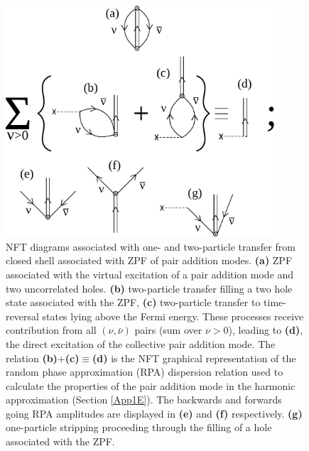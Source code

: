 \begin{figure}[h!]
\centerline {
\includegraphics*[width=10cm]{nutshell/figs/fig2_1_5}
}
\caption{NFT diagrams associated with one- and two-particle transfer from closed shell associated with ZPF of pair addition modes. \textbf{(a)} ZPF associated with the virtual excitation of a pair addition mode and two uncorrelated holes. \textbf{(b)} two-particle transfer filling a two hole state associated with the ZPF, \textbf{(c)} two-particle transfer to time-reversal states lying above the Fermi energy. These processes receive contribution from all $(\nu,\bar\nu)$ pairs (sum over $\nu>0$), leading to \textbf{(d)}, the direct excitation of the collective pair addition mode. The relation \textbf{(b)}+\textbf{(c)}$\equiv$\textbf{(d)} is the NFT graphical representation of the random phase approximation (RPA) dispersion relation used to calculate the properties of the pair addition mode in the harmonic approximation (Section \ref{App1E}). The backwards and forwards going RPA amplitudes are displayed in  \textbf{(e)} and \textbf{(f)} respectively. \textbf{(g)} one-particle stripping proceeding through the filling of a hole associated with the ZPF.}
\label{fig2.1.5}
\end{figure}

